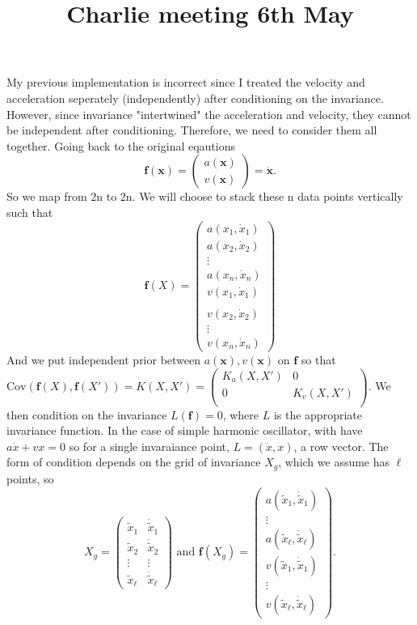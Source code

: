 \documentclass{article}
\title{\vspace{-3cm}Charlie meeting 6th May\vspace{-3em}}
\author{}
\date{}
\begin{document}
\maketitle
My previous implementation is incorrect since I treated the velocity and acceleration seperately (independently) after conditioning on the invariance. 
However, since invariance "intertwined" the acceleration and velocity, they cannot be independent after conditioning.
Therefore, we need to consider them all together.
Going back to the original eqautions
$$\mathbf{f}(\mathbf{x})=\begin{pmatrix}a(\mathbf{x})\\v(\mathbf{x})\end{pmatrix}=\mathbf{\dot{x}}.$$
So we map from 2n to 2n.
We will choose to stack these n data points vertically such that
$$\mathbf{f}(X)=\begin{pmatrix}
  a(x_1, \dot{x}_1) \\ a(x_2, \dot{x}_2) \\ \vdots\\ a(x_n, \dot{x}_n) \\ v(x_1, \dot{x}_1) \\ \\ v(x_2, \dot{x}_2)\\ \vdots \\ v(x_n, \dot{x}_n)
\end{pmatrix}$$
And we put independent prior between $a(\mathbf{x}), v(\mathbf{x})$ on $\mathbf{f}$ so that $\mathrm{Cov}(\mathbf{f}(X), \mathbf{f}(X'))=K(X, X') = \begin{pmatrix}
  K_a(X,X') & 0 \\ 0 & K_v(X,X')\\
\end{pmatrix}.$
We then condition on the invariance $L(\mathbf{f})=0$, where $L$ is the appropriate invariance function. 
In the case of simple harmonic oscillator, with have $a\dot{x}+vx=0$ so for a single invaraiance point, $L=\left(\dot{x},x\right)$, a row vector.
The form of condition depends on the grid of invariance $X_g$, which we assume has $\ell$ points, so $$X_g=\begin{pmatrix}
  \tilde{x}_1 & \dot{\tilde{x}}_1 \\ \tilde{x}_2 & \dot{\tilde{x}}_2  \\ \vdots & \vdots \\ \tilde{x}_{\ell} & \dot{\tilde{x}}_{\ell} 
\end{pmatrix} \text{ and } \mathbf{f}(X_g)=\begin{pmatrix}
  a(\tilde{x}_1, \dot{\tilde{x}}_1) \\ \vdots\\ a(\tilde{x}_{\ell}, \dot{\tilde{x}}_{\ell}) \\ v(\tilde{x}_1, \dot{\tilde{x}}_1) \\ \vdots \\ v(\tilde{x}_{\ell}, \dot{\tilde{x}}_{\ell})
\end{pmatrix}.$$
\end{document}
